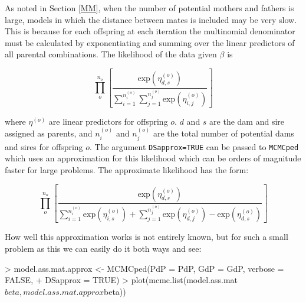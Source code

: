 \documentclass{article}
\begin{document}
As noted in Section \ref{MM}, when the number of potential mothers and fathers is large, models in which the distance between mates is included may be very slow.  This is because for each offspring at each iteration the multinomial denominator must be calculated by exponentiating and summing over the linear predictors of all parental combinations. The likelihood of the data given $\beta$ is 

\begin{equation}
\prod^{n_{o}}_{o}\left[\frac{\textrm{exp}(\eta^{(o)}_{d,s})}{\sum^{n^{(o)}_{i}}_{i=1}\sum^{n^{(o)}_{j}}_{j=1}\textrm{exp}(\eta^{(o)}_{i,j})}\right]
\end{equation}

where $\eta^{(o)}$ are linear predictors for offspring $o$. $d$ and $s$ are the dam and sire assigned as parents, and $n^{(o)}_{i}$ and $n^{(o)}_{j}$ are the total number of potential dams and sires for offspring $o$. The argument \texttt{DSapprox=TRUE} can be passed to \texttt{MCMCped} which uses an approximation for this likelihood which can be orders of magnitude faster for large problems. The approximate likelihood has the form:

\begin{equation}
\prod^{n_{o}}_{o}\left[\frac{\textrm{exp}(\eta^{(o)}_{d,s})}{\sum^{n^{(o)}_{i}}_{i=1}\textrm{exp}(\eta^{(o)}_{i,s})+\sum^{n^{(o)}_{j}}_{j=1}\textrm{exp}(\eta^{(o)}_{d,j})-\textrm{exp}(\eta^{(o)}_{d,s})}\right]
\end{equation}

How well this approximation works is not entirely known, but for such a small problem as this we can easily do it both ways and see: 

\begin{Schunk}
\begin{Sinput}
> model.ass.mat.approx <- MCMCped(PdP = PdP, GdP = GdP, verbose = FALSE, 
+     DSapprox = TRUE)
> plot(mcmc.list(model.ass.mat$beta, model.ass.mat.approx$beta))
\end{Sinput}
\end{Schunk}
\end{document}
